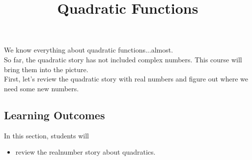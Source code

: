 \documentclass{ximera}
\title{Quadratic Functions}
\begin{document}
\begin{abstract}
\end{abstract}
\maketitle



We know everything about quadratic functions...almost. \\

So far, the quadratic story has not included complex numbers.  This course will bring them into the picture. \\



First, let's review the quadratic story with real numbers and figure out where we need some new numbers.













\subsection{Learning Outcomes}

\begin{sectionOutcomes}
In this section, students will 

\begin{itemize}
\item review the realnumber story about quadratics.
\end{itemize}
\end{sectionOutcomes}
\end{document}
